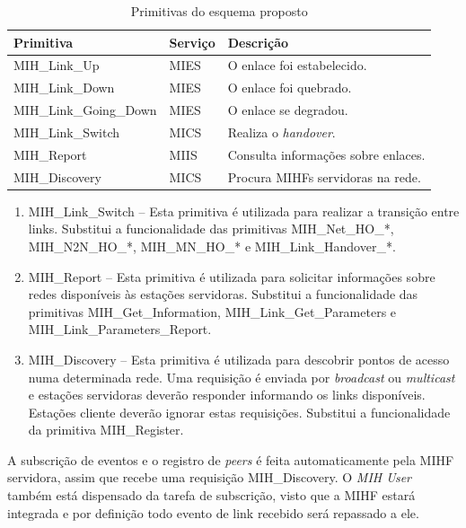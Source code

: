 \documentclass[12pt]{article}
\begin{document}
\begin{table}[ht]
	\centering
	\caption{Primitivas do esquema proposto}
	\label{tab:primitivas}
	\begin{tabular}[ht]{ l | l | l }
		Primitiva & Serviço & Descrição \\
		\hline
		MIH\_Link\_Up          & MIES & O enlace foi estabelecido.  \\
		MIH\_Link\_Down        & MIES & O enlace foi quebrado.  \\
		MIH\_Link\_Going\_Down & MIES & O enlace se degradou. \\
		MIH\_Link\_Switch      & MICS & Realiza o \textit{handover}. \\
		MIH\_Report          & MIIS & Consulta informações sobre enlaces. \\
		MIH\_Discovery   & MICS & Procura MIHFs servidoras na rede.  \\
		\hline
	\end{tabular}
	
\end{table}

\begin{enumerate}

	\item MIH\_Link\_Switch -- Esta primitiva é utilizada para realizar a 
		transição entre links. Substitui a funcionalidade das primitivas 
		MIH\_Net\_HO\_*, MIH\_N2N\_HO\_*, MIH\_MN\_HO\_* e 
		MIH\_Link\_Handover\_*.
	
	\item MIH\_Report -- Esta primitiva é utilizada para solicitar informações 
		sobre redes disponíveis às estações servidoras. Substitui a 
		funcionalidade das primitivas MIH\_Get\_Information, 
		MIH\_Link\_Get\_Parameters e MIH\_Link\_Parameters\_Report.
	
	\item MIH\_Discovery -- Esta primitiva é utilizada para descobrir
		pontos de acesso numa determinada rede. Uma requisição é enviada por 
		\textit{broadcast} ou \textit{multicast} e estações servidoras deverão 
		responder informando os links disponíveis. Estações cliente deverão 
		ignorar estas requisições. Substitui a funcionalidade da primitiva
		MIH\_Register.

\end{enumerate}

A subscrição de eventos e o registro de \textit{peers} é feita automaticamente 
pela MIHF servidora, assim que recebe uma requisição MIH\_Discovery. O 
\textit{MIH User} também está dispensado da tarefa de subscrição, visto que a 
MIHF estará integrada e por definição todo evento de link recebido será 
repassado a ele.
\end{document}
